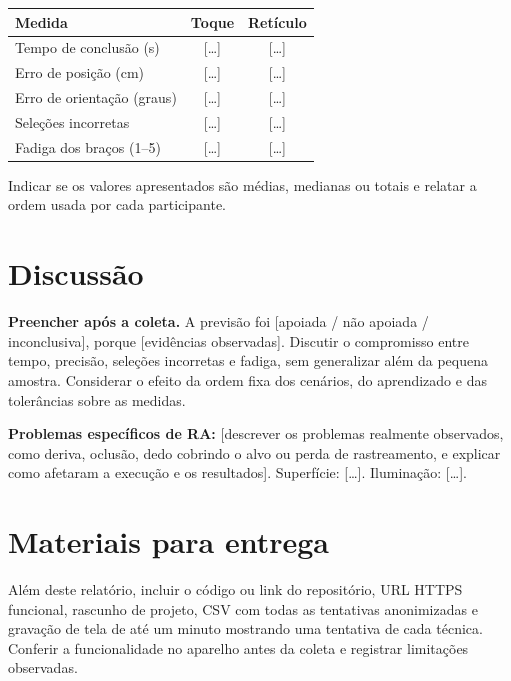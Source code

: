 \documentclass[11pt,a4paper]{article}
\begin{document}
\begin{center}
\begin{tabular}{lcc}
\toprule
Medida & Toque & Retículo \\
\midrule
Tempo de conclusão (s) & [\ldots] & [\ldots] \\
Erro de posição (cm) & [\ldots] & [\ldots] \\
Erro de orientação (graus) & [\ldots] & [\ldots] \\
Seleções incorretas & [\ldots] & [\ldots] \\
Fadiga dos braços (1--5) & [\ldots] & [\ldots] \\
\bottomrule
\end{tabular}
\end{center}
Indicar se os valores apresentados são médias, medianas ou totais e relatar a ordem usada por cada participante.

\section{Discussão}
\textbf{Preencher após a coleta.} A previsão foi [apoiada / não apoiada / inconclusiva], porque [evidências observadas]. Discutir o compromisso entre tempo, precisão, seleções incorretas e fadiga, sem generalizar além da pequena amostra. Considerar o efeito da ordem fixa dos cenários, do aprendizado e das tolerâncias sobre as medidas.

\textbf{Problemas específicos de RA:} [descrever os problemas realmente observados, como deriva, oclusão, dedo cobrindo o alvo ou perda de rastreamento, e explicar como afetaram a execução e os resultados]. Superfície: [\ldots]. Iluminação: [\ldots].

\section{Materiais para entrega}
Além deste relatório, incluir o código ou link do repositório, URL HTTPS funcional, rascunho de projeto, CSV com todas as tentativas anonimizadas e gravação de tela de até um minuto mostrando uma tentativa de cada técnica. Conferir a funcionalidade no aparelho antes da coleta e registrar limitações observadas.
\end{document}
